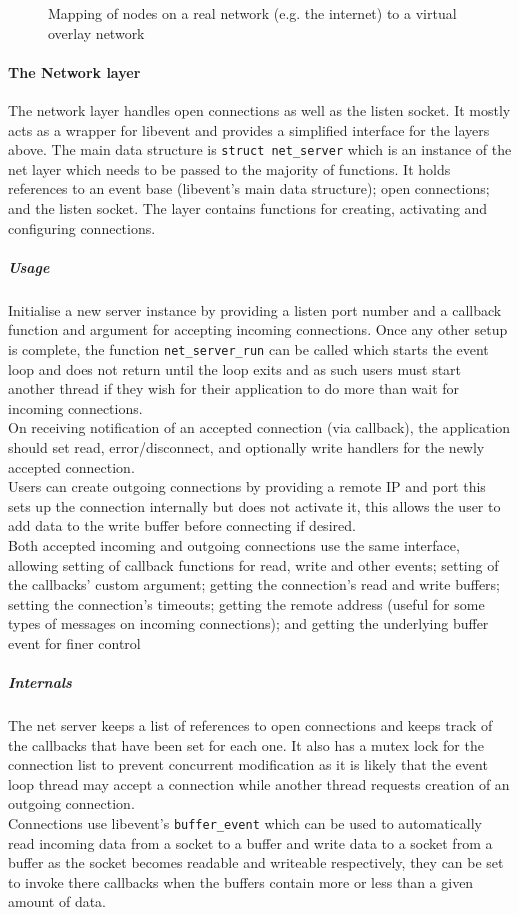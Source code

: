 \documentclass{article}
\begin{document}
\begin{figure}
\centering
\def\svgwidth{\columnwidth}

\caption{Mapping of nodes on a real network (e.g. the internet) to a virtual overlay network}
\end{figure}

\paragraph{The Network layer}
The network layer handles open connections as well as the listen socket. It mostly acts as a wrapper for libevent and provides a simplified interface for the layers above. The main data structure is \texttt{struct net\_server} which is an instance of the net layer which needs to be passed to the majority of functions. It holds references to an event base (libevent's main data structure); open connections; and the listen socket. The layer contains functions for creating, activating and configuring connections.

\subparagraph{Usage}
Initialise a new server instance by providing a listen port number and a callback function and argument for accepting incoming connections. Once any other setup is complete, the function \texttt{net\_server\_run} can be called which starts the event loop and does not return until the loop exits and as such users must start another thread if they wish for their application to do more than wait for incoming connections.
\\
On receiving notification of an accepted connection (via callback), the application should set read, error/disconnect, and optionally write handlers for the newly accepted connection.
\\
Users can create outgoing connections by providing a remote IP and port this sets up the connection internally but does not activate it, this allows the user to add data to the write buffer before connecting if desired.
\\
Both accepted incoming and outgoing connections use the same interface, allowing setting of callback functions for read, write and other events; setting of the callbacks' custom argument; getting the connection's read and write buffers; setting the connection's timeouts; getting the remote address (useful for some types of messages on incoming connections); and getting the underlying buffer event for finer control

\subparagraph{Internals}
The net server keeps a list of references to open connections and keeps track of the callbacks that have been set for each one. It also has a mutex lock for the connection list to prevent concurrent modification as it is likely that the event loop thread may accept a connection while another thread requests creation of an outgoing connection.
\\
Connections use libevent's \texttt{buffer\_event} which can be used to automatically read incoming data from a socket to a buffer and write data to a socket from a buffer as the socket becomes readable and writeable respectively, they can be set to invoke there callbacks when the buffers contain more or less than a given amount of data.
\end{document}
